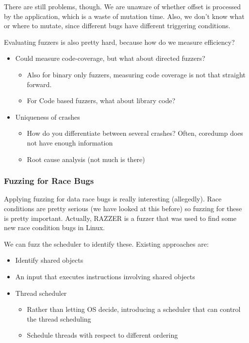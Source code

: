 \documentclass[11pt,a4paper,titlepage,dvipsnames,cmyk]{scrartcl}
\begin{document}
There are still problems, though. We are unaware of whether offset is processed by the application, which is a waste of mutation time. Also, we don't know what or where to mutate, since different bugs have different triggering conditions.

Evaluating fuzzers is also pretty hard, because how do we measure efficiency?
\begin{itemize}
    \item Could measure code-coverage, but what about directed fuzzers?
    \begin{itemize}
        \item Also for binary only fuzzers, measuring code coverage is not that straight forward.
        \item For Code based fuzzers, what about library code?
    \end{itemize}
    \item Uniqueness of crashes
    \begin{itemize}
        \item How do you differentiate between several crashes? Often, coredump does not have enough information
        \item Root cause analysis (not much is there)
    \end{itemize}
\end{itemize}

\subsubsection{Fuzzing for Race Bugs}
Applying fuzzing for data race bugs is really interesting (allegedly). Race conditions are pretty serious (we have looked at this before) so fuzzing for these is pretty important. Actually, RAZZER is a fuzzer that was used to find some new race condition bugs in Linux. 

We can fuzz the scheduler to identify these. Existing approaches are:
\begin{itemize}
    \item Identify shared objects
    \item An input that executes instructions involving shared objects
    \item Thread scheduler
    \begin{itemize}
        \item Rather than letting OS decide, introducing a scheduler that can control the thread scheduling
        \item Schedule threads with respect to different ordering
    \end{itemize} 
\end{itemize}
\end{document}
